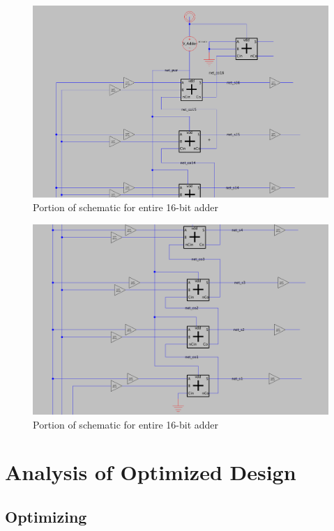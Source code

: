 \documentclass{article}
\begin{document}
\begin{figure}[H]
  \includegraphics[width=\linewidth]{opt_screenshots/opt_16b_adder_sch_zoom1.png}
  \caption{Portion of schematic for entire 16-bit adder}
  \label{fig:opt_16b_adder_sch_zoom1}
\end{figure}

\begin{figure}[H]
  \includegraphics[width=\linewidth]{opt_screenshots/opt_16b_adder_sch_zoom2.png}
  \caption{Portion of schematic for entire 16-bit adder}
  \label{fig:opt_16b_adder_sch_zoom2}
\end{figure}


\section{Analysis of Optimized Design}
\subsection{Optimizing}
\end{document}
